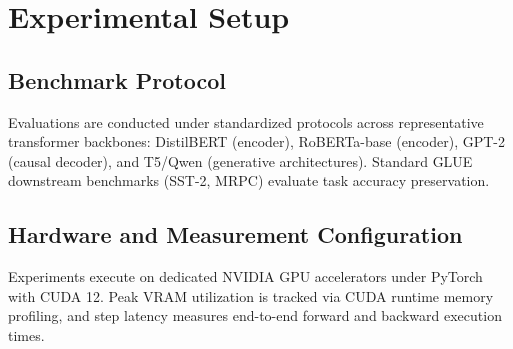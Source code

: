 \section{Experimental Setup}

\subsection{Benchmark Protocol}
Evaluations are conducted under standardized protocols across representative transformer backbones: DistilBERT (encoder), RoBERTa-base (encoder), GPT-2 (causal decoder), and T5/Qwen (generative architectures). Standard GLUE downstream benchmarks (SST-2, MRPC) evaluate task accuracy preservation.

\subsection{Hardware and Measurement Configuration}
Experiments execute on dedicated NVIDIA GPU accelerators under PyTorch with CUDA 12. Peak VRAM utilization is tracked via CUDA runtime memory profiling, and step latency measures end-to-end forward and backward execution times.
